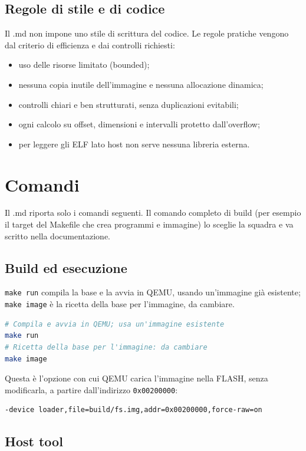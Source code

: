 \subsection{Regole di stile e di codice}

Il .md non impone uno stile di scrittura del codice. Le regole pratiche vengono dal criterio di efficienza e dai controlli richiesti:
\begin{itemize}
\item uso delle risorse limitato (bounded);
\item nessuna copia inutile dell'immagine e nessuna allocazione dinamica;
\item controlli chiari e ben strutturati, senza duplicazioni evitabili;
\item ogni calcolo su offset, dimensioni e intervalli protetto dall'overflow;
\item per leggere gli ELF lato host non serve nessuna libreria esterna.
\end{itemize}

\section{Comandi}

Il .md riporta solo i comandi seguenti. Il comando completo di build (per esempio il target del Makefile che crea programmi e immagine) lo sceglie la squadra e va scritto nella documentazione.

\subsection{Build ed esecuzione}

\texttt{make run} compila la base e la avvia in QEMU, usando un'immagine già esistente; \texttt{make image} è la ricetta della base per l'immagine, da cambiare.
\begin{lstlisting}[language=bash]
# Compila e avvia in QEMU; usa un'immagine esistente
make run
# Ricetta della base per l'immagine: da cambiare
make image
\end{lstlisting}

Questa è l'opzione con cui QEMU carica l'immagine nella FLASH, senza modificarla, a partire dall'indirizzo \texttt{0x00200000}:
\begin{lstlisting}[language=bash]
-device loader,file=build/fs.img,addr=0x00200000,force-raw=on
\end{lstlisting}

\subsection{Host tool}

